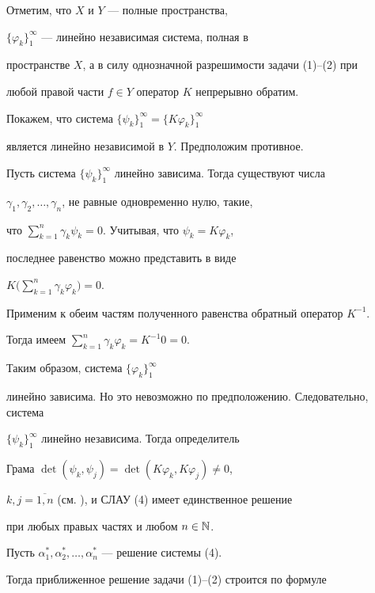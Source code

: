\begin{pf}


Отметим, что $X$ и $Y$ --- полные пространства, 


$\{\varphi_{k}\}_{1}^{\infty}$ --- линейно независимая система, полная в 


пространстве $X$, а в силу однозначной разрешимости задачи (1)--(2) при 


любой правой части $f\in Y$ оператор $K$ непрерывно обратим. 





Покажем, что система $\{\psi_{k}\}_{1}^{\infty}=\{K\varphi_{k}\}_{1}^{\infty}$


является линейно независимой в $Y$. Предположим противное. 


Пусть система $\{\psi_{k}\}_{1}^{\infty}$ линейно зависима. Тогда существуют числа 


$\gamma_1, \gamma_2,\dotsc,\gamma_n$, не равные одновременно нулю, такие, 


что $\sum\limits_{k=1}^n \gamma_k \psi_k=0$. Учитывая, что $\psi_k=K\varphi_k$,


последнее равенство можно представить в виде


$K\Big(\sum\limits_{k=1}^n \gamma_k \varphi_k \Big)=0$.


Применим к обеим частям полученного равенства обратный оператор $K^{-1}$. 


Тогда имеем $\sum\limits_{k=1}^n \gamma_k \varphi_k=K^{-1}0=0$. 


Таким образом, система $\{\varphi_{k}\}_{1}^{\infty}$ 


линейно зависима. Но это невозможно по предположению. Следовательно, система


$\{\psi_{k}\}_{1}^{\infty}$ линейно независима. Тогда определитель 


Грама $\det(\psi_{k},\psi_{j})=\det(K\varphi_{k},K\varphi_{j})\neq 0$,


$k,j=\overline{1,n}$ (см. \cite{1}), и СЛАУ (4) имеет единственное решение 


при любых правых частях и любом $n\in\Bbb{N}$.





Пусть $\alpha_1^*, \alpha_2^*,\dotsc,\alpha_n^*$ --- решение системы (4).


Тогда приближенное решение задачи (1)--(2) строится по формуле 


\begin{equation}



\end{equation}
\end{pf}

